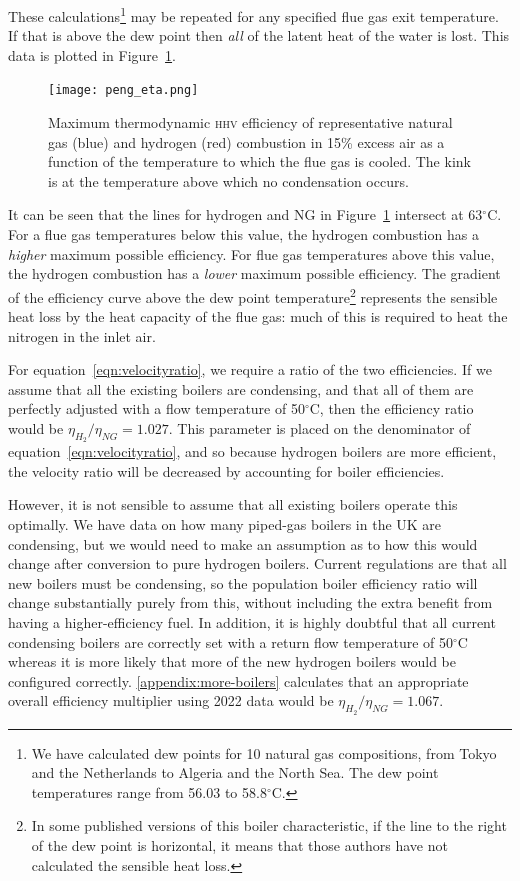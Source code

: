 \documentclass[5p]{elsarticle} %
\begin{document}
These calculations\footnote{
We have calculated dew points for 10 natural gas compositions, from Tokyo and the Netherlands to Algeria and the North Sea. The dew point temperatures range from 56.03 to 58.8$^\circ$C\citep{Sargents_github}.
} may be repeated for any specified flue gas exit temperature. 
If that is above the dew point then \emph{all} of the latent heat of the water is lost.
This data is plotted in Figure~\ref{fig:efficiency}.

\begin{figure}[ht]
    \centering
    \texttt{[image: peng\_eta.png]}
    \caption{ Maximum thermodynamic \textsc{hhv} efficiency of representative natural gas (blue) and hydrogen (red) combustion in 15\% excess air as a function of the temperature to which the flue gas is cooled. The kink is at the temperature above which no condensation occurs. }
    \label{fig:efficiency}
\end{figure}

It can be seen that the lines for hydrogen and NG in Figure~\ref{fig:efficiency} intersect at 63$^\circ$C.
For a flue gas temperatures below this value, the hydrogen combustion has a \emph{higher} maximum possible efficiency.
For flue gas temperatures above this value, the hydrogen combustion has a \emph{lower} maximum possible efficiency.
The gradient of the efficiency curve above the dew point temperature\footnote{In some published versions of this boiler characteristic, if the line to the right of the dew point is horizontal, it means that those authors have not calculated the sensible heat loss. 
} represents the sensible heat loss by the heat capacity of the flue gas: much of this is required to heat the nitrogen in the inlet air. 

For equation~\eqref{eqn:velocityratio}, we require a ratio of the two efficiencies.
If we assume that all the existing boilers are condensing, and that all of them are perfectly adjusted with a flow temperature of 50$^\circ$C, then the efficiency ratio would be $\eta_{H_2} / \eta_{NG} = 1.027$.
This parameter is placed on the denominator of equation~\eqref{eqn:velocityratio}, and so because hydrogen boilers are more efficient, the velocity ratio will be decreased by accounting for boiler efficiencies.

However, it is not sensible to assume that all existing boilers operate this optimally.
We have data on how many piped-gas boilers in the UK are condensing, but we would need to make an assumption as to how this would change after conversion to pure hydrogen boilers. 
Current regulations\citep{GASTEC2009} are that all new boilers must be condensing, so the population boiler efficiency ratio will change substantially purely from this, without including the extra benefit from having a higher-efficiency fuel. 
In addition, it is highly doubtful that all current condensing boilers are correctly set with a return flow temperature of 50$^\circ$C whereas it is more likely that more of the new hydrogen boilers would be configured correctly. 
\ref{appendix:more-boilers} calculates that an appropriate overall efficiency multiplier using 2022 data would be $\eta_{H_2} / \eta_{NG} = 1.067$.
\end{document}
